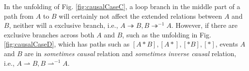 \documentclass{llncs}
\begin{document}
In the unfolding of Fig. \ref{fig:causalCaseC}, a loop branch in the middle part of a path from $A$ to $B$ will certainly not affect the extended relations between $A$ and $B$, neither will a exclusive branch, i.e., $A\twoheadrightarrow B,B\twoheadrightarrow^{-1}A$. However, if there are exclusive branches across both $A$ and $B$, such as the unfolding in Fig. \ref{fig:causalCaseD}, which has paths such as $[A*B],[A*],[*B],[*]$, events $A$ and $B$ are in \textit{sometimes causal} relation and \textit{sometimes inverse causal} relation, i.e., $A\rightharpoonup B,B\rightharpoonup^{-1}A$.

\begin{figure}[htb]
\centering
{}
\end{figure}
\end{document}
